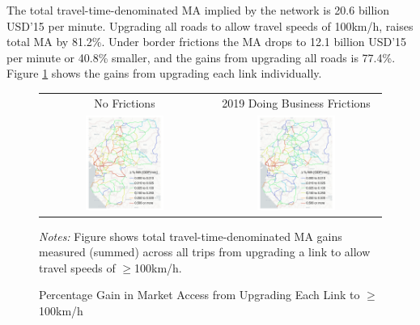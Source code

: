 \documentclass[a4paper]{article}
\begin{document}
The total travel-time-denominated MA implied by the network is 20.6 billion USD'15 per minute. Upgrading all roads to allow travel speeds of 100km/h, raises total MA by 81.2\%. Under border frictions the MA drops to 12.1 billion USD'15 per minute or 40.8\% smaller, and the gains from upgrading all roads is 77.4\%. Figure \ref{fig:MA_TT} shows the gains from upgrading each link individually. 


\begin{figure}[H]  \vspace{-1mm}
\centering
\caption{\label{fig:MA_TT} Percentage Gain in Market Access from Upgrading Each Link to $\geq$100km/h}
\vspace{2mm}
\begin{tabular}{cc}
No Frictions & 2019 Doing Business Frictions \\
\includegraphics[width=0.48\textwidth]{"../figures/PE/trans_CEMAC_network_MA_100_min_speed_perc_google.pdf"} &
\includegraphics[width=0.48\textwidth]{"../figures/PE/trans_CEMAC_network_MA_100_min_speed_bt_perc_google.pdf"}  \\ [-0.2em]
\end{tabular}
\raggedright
\scriptsize 
\emph{Notes:} Figure shows total travel-time-denominated MA gains measured (summed) across all trips from upgrading a link to allow travel speeds of $\geq$100km/h. 
\end{figure}
\end{document}
